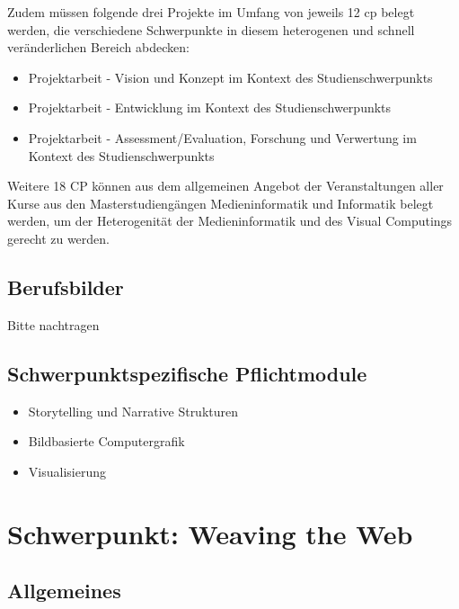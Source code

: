 Zudem müssen folgende drei Projekte im Umfang von jeweils 12 cp belegt
werden, die verschiedene Schwerpunkte in diesem heterogenen und schnell
veränderlichen Bereich abdecken:

\begin{itemize}
\tightlist
\item
  Projektarbeit - Vision und Konzept im Kontext des Studienschwerpunkts
\item
  Projektarbeit - Entwicklung im Kontext des Studienschwerpunkts
\item
  Projektarbeit - Assessment/Evaluation, Forschung und Verwertung im
  Kontext des Studienschwerpunkts
\end{itemize}

Weitere 18 CP können aus dem allgemeinen Angebot der Veranstaltungen
aller Kurse aus den Masterstudiengängen Medieninformatik und Informatik
belegt werden, um der Heterogenität der Medieninformatik und des Visual
Computings gerecht zu werden.

\section*{Berufsbilder}\label{berufsbilder-3}

Bitte nachtragen

\section*{Schwerpunktspezifische
Pflichtmodule}\label{schwerpunktspezifische-pflichtmodule-3}

\begin{itemize}
\tightlist
\item
  Storytelling und Narrative Strukturen
\item
  Bildbasierte Computergrafik
\item
  Visualisierung
\end{itemize}

\chapter{Schwerpunkt: Weaving the
Web}\label{schwerpunkt-weaving-the-web}

\section*{Allgemeines}\label{allgemeines-3}

